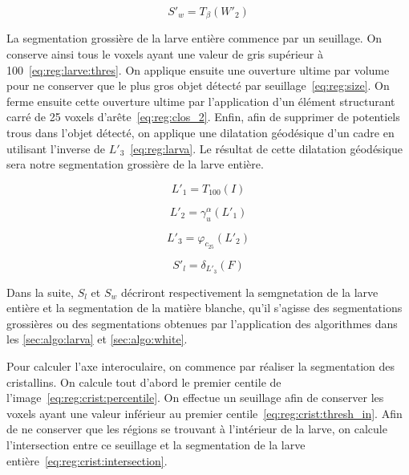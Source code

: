 \documentclass[\main/main.tex]{subfiles}
\begin{document}
\begin{equation}
    \label{eq:reg:white}
    S'_w = T_{\beta}(W'_2)
\end{equation}

%
La segmentation grossière de la larve entière commence par un seuillage.
%
On conserve ainsi tous le voxels ayant une valeur de gris supérieur à 100~\eqref{eq:reg:larve:thres}.
%
On applique ensuite une ouverture ultime par volume pour ne conserver que le plus gros objet détecté par seuillage~\eqref{eq:reg:size}.
%
On ferme ensuite cette ouverture ultime par l'application d'un élément structurant carré de 25 voxels d'arête~\eqref{eq:reg:clos_2}.
%
Enfin, afin de supprimer de potentiels trous dans l'objet détecté, on applique une dilatation géodésique d'un cadre en utilisant l'inverse de $L'_3$~\eqref{eq:reg:larva}.
%
Le résultat de cette dilatation géodésique sera notre segmentation grossière de la larve entière.

\begin{equation}
    \label{eq:reg:larve:thresh}
    L'_{1} = T_{100}(I)
\end{equation}

\begin{equation}
\label{eq:white:open_volume}
    L'_{2} = \gamma^{\alpha}_{u}(L'_1)
\end{equation}

\begin{equation}
    \label{eq:reg:clos_2}
    L'_{3} = \varphi_{c_25}(L'_2)
\end{equation}

\begin{equation}
    \label{eq:reg:larva}
    S'_l = \delta_{L'_3}(F)
\end{equation}

%
Dans la suite, $S_l$ et $S_w$ décriront respectivement la semgnetation de la larve entière et la segmentation de la matière blanche, qu'il s'agisse des segmentations grossières ou des segmentations obtenues par l'application des algorithmes dans les \autoref{sec:algo:larva} et \autoref{sec:algo:white}.

%
Pour calculer l'axe interoculaire, on commence par réaliser la segmentation des cristallins.
%
On calcule tout d'abord le premier centile de l'image~\eqref{eq:reg:crist:percentile}.
%
On effectue un seuillage afin de conserver les voxels ayant une valeur inférieur au premier centile~\eqref{eq:reg:crist:thresh_in}.
%
Afin de ne conserver que les régions se trouvant à l'intérieur de la larve, on calcule l'intersection entre ce seuillage et la segmentation de la larve entière~\eqref{eq:reg:crist:intersection}.
%
\end{document}
